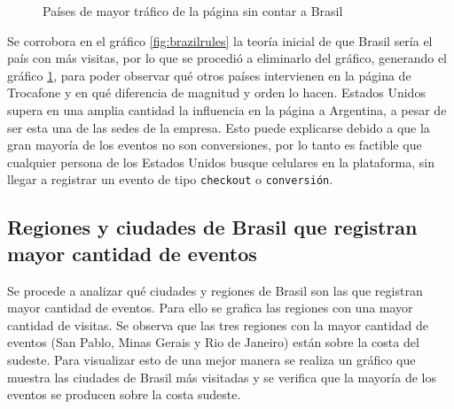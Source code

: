 \documentclass[a4paper]{article}
\begin{document}
\begin{figure}[h!]
	\caption{Países de mayor tráfico de la página sin contar a Brasil}
	\label{fig:brazilsucks}
\end{figure}

Se corrobora en el gráfico \ref{fig:brazilrules} la teoría inicial de que Brasil sería el país con más visitas, por lo que se procedió a eliminarlo del gráfico, generando el gráfico \ref{fig:brazilsucks}, para poder observar qué otros países intervienen en la página de Trocafone y en qué diferencia de magnitud y orden lo hacen. Estados Unidos supera en una amplia cantidad la influencia en la página a Argentina, a pesar de ser esta una de las sedes de la empresa. Esto puede explicarse debido a que la gran mayoría de los eventos no son conversiones, por lo tanto es factible que cualquier persona de los Estados Unidos busque celulares en la plataforma, sin llegar a registrar un evento de tipo \texttt{checkout} o \texttt{conversión}.

\subsection{Regiones y ciudades de Brasil que registran mayor cantidad de eventos}

Se procede a analizar qué ciudades y regiones de Brasil son las que registran mayor cantidad de eventos. Para ello se grafica las regiones con una mayor cantidad de visitas. Se observa que las tres regiones con la mayor cantidad de eventos (San Pablo, Minas Gerais y Rio de Janeiro) están sobre la costa del sudeste. Para visualizar esto de una mejor manera se realiza un gráfico que muestra las ciudades de Brasil más visitadas y se verifica que la mayoría de los eventos se producen sobre la costa sudeste.
\end{document}
